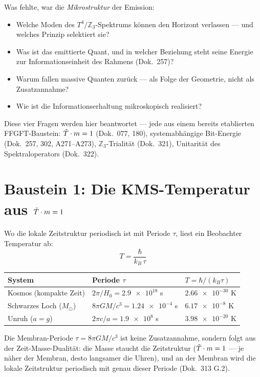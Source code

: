 Was fehlte, war die \emph{Mikrostruktur} der Emission:
\begin{itemize}
  \item Welche Moden des $T^4/\mathbb{Z}_3$-Spektrums können den
    Horizont verlassen — und welches Prinzip selektiert sie?
  \item Was ist das emittierte Quant, und in welcher Beziehung steht
    seine Energie zur Informationseinheit des Rahmens (Dok.\ 257)?
  \item Warum fallen massive Quanten zurück — als Folge der Geometrie,
    nicht als Zusatzannahme?
  \item Wie ist die Informationserhaltung mikroskopisch realisiert?
\end{itemize}
Diese vier Fragen werden hier beantwortet — jede aus einem bereits
etablierten FFGFT-Baustein: $\tilde{T}\cdot m = 1$ (Dok.\ 077, 180),
systemabhängige Bit-Energie (Dok.\ 257, 302, A271–A273),
$\mathbb{Z}_3$-Trialität (Dok.\ 321), Unitarität des Spektraloperators
(Dok.\ 322).

\section{Baustein 1: Die KMS-Temperatur aus \texorpdfstring{$\tilde{T}\cdot m = 1$}{T*m=1}}

Wo die lokale Zeitstruktur periodisch ist mit Periode $\tau$,
liest ein Beobachter Temperatur ab:
\begin{equation}
  T = \frac{\hbar}{k_B\,\tau}
  \label{eq:kms}
\end{equation}

\begin{center}
\small
\begin{tabular}{@{}lll@{}}
  \toprule
  System & Periode $\tau$ & $T = \hbar/(k_B\tau)$ \\
  \midrule
  Kosmos (kompakte Zeit) & $2\pi/H_0 = \num{2.9e18}$ s & $\num{2.66e-30}$ K \\
  Schwarzes Loch ($M_\odot$) & $8\pi GM/c^3 = \num{1.24e-4}$ s & $\num{6.17e-8}$ K \\
  Unruh ($a = g$) & $2\pi c/a = \num{1.9e8}$ s & $\num{3.98e-20}$ K \\
  \bottomrule
\end{tabular}
\end{center}

Die Membran-Periode $\tau = 8\pi GM/c^3$ ist keine Zusatzannahme,
sondern folgt aus der Zeit-Masse-Dualität: die Masse staucht die
Zeitstruktur ($\tilde{T}\cdot m = 1$ — je näher der Membran, desto langsamer
die Uhren), und an der Membran wird die lokale Zeitstruktur periodisch
mit genau dieser Periode (Dok.\ 313 G.2). \K


